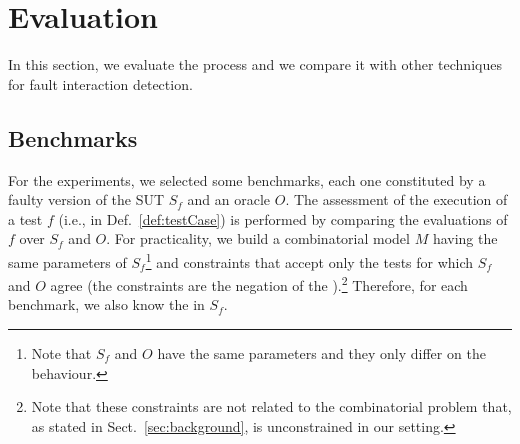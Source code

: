 \begin{tikzborder}{\cite{Gargantini16:validation}}
\begin{tikzborder}{\cite{gargantini_combinatorial_2017}}
\begin{tikzborder}{\cite{garn2019}}
\begin{tikzborder}{\cite{arcaini2019achieving}}
\section{Evaluation}\label{sec:evaluation3}

\begin{tikzborder}{}
In this section, we evaluate the process and we compare it with other techniques for fault interaction detection.
\end{tikzborder}

\subsection{Benchmarks}\label{sec:benchmarks}

\begin{tikzborder}{}
For the experiments, we selected some benchmarks, each one constituted by a faulty version of the SUT $S_f$ and an oracle $O$. The assessment of the execution of a test $f$ (i.e., \result in Def.~\ref{def:testCase}) is performed by comparing the evaluations of $f$ over $S_f$ and $O$. For practicality, we build a combinatorial model $M$ having the same parameters of $S_f$\footnote{Note that $S_f$ and $O$ have the same parameters and they only differ on the behaviour.} and constraints that accept only the tests for which $S_f$ and $O$ agree (the constraints are the negation of the \truemfics).\footnote{Note that these constraints are not related to the combinatorial problem that, as stated in Sect.~\ref{sec:background}, is unconstrained in our setting.} Therefore, for each benchmark, we also know the \truemfics in $S_f$.


\end{tikzborder}
\end{tikzborder}
\end{tikzborder}
\end{tikzborder}
\end{tikzborder}
